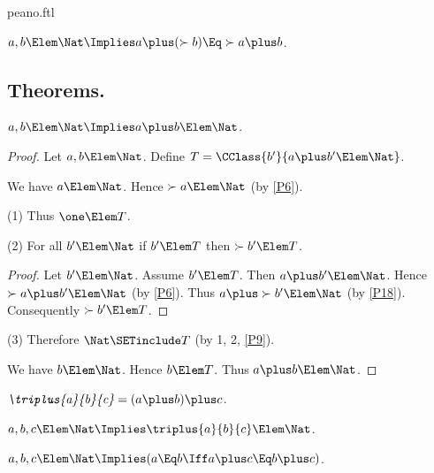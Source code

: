 \documentclass{stex}
\begin{document}
\begin{smodule}{peano.ftl}
\begin{forthel}
  \begin{axiom*}[title=18,id=P18]
    $a,b \Elem \Nat \Implies a \plus (\succ{b}) \Eq \succ{a \plus b}$.
  \end{axiom*}
\end{forthel}


\subsection{Theorems.}

\begin{forthel}
  \begin{theorem*}[title=19,id=P19]
    $a,b \Elem \Nat \Implies a \plus b \Elem \Nat$.
  \end{theorem*}
  \begin{proof}
    Let $a,b \Elem \Nat$.
    Define $T = \CClass{b'}{a \plus b' \Elem \Nat}$.
    
    We have $a \Elem \Nat$.
    Hence $\succ{a} \Elem \Nat$ (by \ref{P6}).
    
    (1) Thus $\one \Elem T$.

    (2) For all $b' \Elem \Nat$ if $b' \Elem T$ then $\succ{b'} \Elem T$.
    \begin{proof}
      Let $b' \Elem \Nat$.
      Assume $b' \Elem T$.
      Then $a \plus b' \Elem \Nat$.
      Hence $\succ{a \plus b'} \Elem \Nat$ (by \ref{P6}).
      Thus $a \plus \succ{b'} \Elem \Nat$ (by \ref{P18}).
      Consequently $\succ{b'} \Elem T$.
    \end{proof}

    (3) Therefore $\Nat \SETinclude T$ (by 1, 2, \ref{P9}).

    We have $b \Elem \Nat$.
    Hence $b \Elem T$.
    Thus $a \plus b \Elem \Nat$.
  \end{proof}

  \begin{definition*}[title=20,id=P20]
    $\emph{\triplus{a}{b}{c}} = (a \plus b) \plus c$.
  \end{definition*}

  \begin{theorem*}[title=21,id=P21]
    $a,b,c \Elem \Nat \Implies \triplus{a}{b}{c} \Elem \Nat$.
  \end{theorem*}

  \begin{theorem*}[title=22,id=P22]
    $a,b,c \Elem \Nat \Implies (a \Eq b \Iff a \plus c \Eq b \plus c)$.
  \end{theorem*}


\end{forthel}
\end{smodule}
\end{document}
